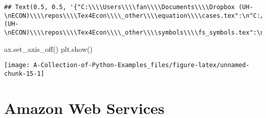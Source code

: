 \documentclass[
]{book}
\newenvironment{Shaded}{\begin{snugshade}}{\end{snugshade}}
\newcommand{\NormalTok}[1]{#1}
\begin{document}
\begin{verbatim}
## Text(0.5, 0.5, '{"C:\\\\Users\\\\fan\\\\Documents\\\\Dropbox (UH-\nECON)\\\\repos\\\\Tex4Econ\\\\_other\\\\equation\\\\cases.tex":\n"C:/Users/fan/Documents/cases.pdf",\n"C:\\\\Users\\\\fan\\\\Documents\\\\Dropbox (UH-\nECON)\\\\repos\\\\Tex4Econ\\\\_other\\\\symbols\\\\fs_symbols.tex":\n"C:/Users/fan/Documents/fs_symbols.pdf"}')
\end{verbatim}

\begin{Shaded}
\begin{Highlighting}[]
\NormalTok{ax.set\_axis\_off()}
\NormalTok{plt.show()}
\end{Highlighting}
\end{Shaded}

\begin{center}\texttt{[image: A-Collection-of-Python-Examples\_files/figure-latex/unnamed-chunk-15-1]} \end{center}

\hypertarget{amazon-web-services}{%
\chapter{Amazon Web Services}\label{amazon-web-services}}
\end{document}
